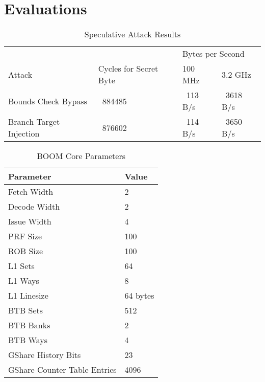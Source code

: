 \section{Evaluations}

\begin{table}
\centering
\caption{Speculative Attack Results}
\label{tab:spec-attack-results}
\begin{tabular}{@{} *4l @{}} \toprule
    &                        & \multicolumn{2}{l}{Bytes per Second} \\
    Attack                  & Cycles for Secret Byte &           100 MHz &   3.2 GHz \\ \midrule
    Bounds Check Bypass     &                ~884485 &          ~113 B/s & ~3618 B/s \\
    Branch Target Injection &                ~876602 &          ~114 B/s & ~3650 B/s \\ \bottomrule
\end{tabular}
\end{table}

\begin{table}
\centering \caption{BOOM Core Parameters} \label{tab:boom-core-params}
\begin{tabular}{@{} *2l @{}} \toprule
    Parameter                    & Value \\ \midrule
    Fetch Width                  & 2 \\
    Decode Width                 & 2 \\
    Issue Width                  & 4 \\
    PRF Size                     & 100 \\
    ROB Size                     & 100 \\ \midrule
    L1 Sets                      & 64 \\
    L1 Ways                      & 8 \\
    L1 Linesize                  & 64 bytes \\ \midrule
    BTB Sets                     & 512 \\
    BTB Banks                    & 2 \\
    BTB Ways                     & 4 \\ \midrule
    GShare History Bits          & 23 \\
    GShare Counter Table Entries & 4096 \\ \bottomrule
\end{tabular}
\end{table}

